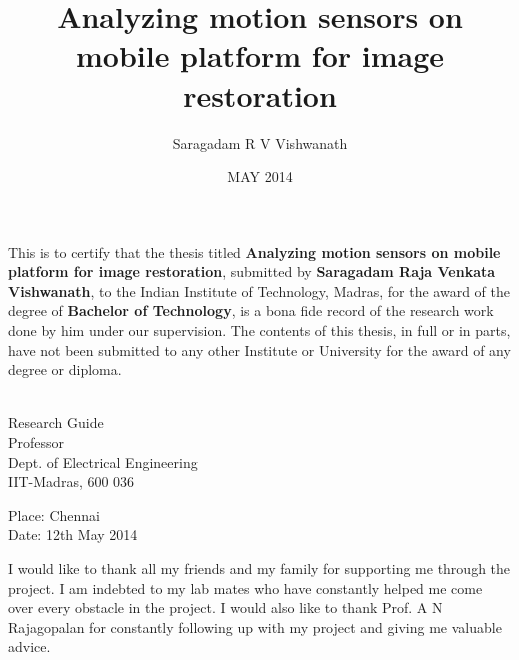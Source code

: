 \documentclass[BTech]{iitmdiss}
\begin{document}
\title{Analyzing motion sensors on mobile platform for image restoration}
\author{Saragadam R V Vishwanath}
\date{MAY 2014}
\maketitle
\pagebreak

\certificate

\vspace*{0.5in}

\noindent This is to certify that the thesis titled {\bf Analyzing
 motion sensors on mobile platform for image restoration}, submitted by
  {\bf Saragadam Raja Venkata Vishwanath}, 
  to the Indian Institute of Technology, Madras, for
the award of the degree of {\bf Bachelor of Technology}, is a bona fide
record of the research work done by him under our supervision.  The
contents of this thesis, in full or in parts, have not been submitted
to any other Institute or University for the award of any degree or
diploma.

\vspace*{1.5in}

\begin{singlespacing}
\hspace*{-0.25in}
\parbox{2.5in}{
 \\
\noindent Research Guide \\ 
\noindent Professor \\
\noindent Dept. of Electrical Engineering\\
\noindent IIT-Madras, 600 036 \\
} 
\hspace*{1.0in} 
\end{singlespacing}
\vspace*{0.25in}
\noindent Place: Chennai\\
Date: 12th May 2014

\pagebreak

\acknowledgements

I would like to thank all my friends and my family for supporting me 
through the project. I am indebted to my lab mates who have constantly 
helped me come over every obstacle in the project. I would also like to 
thank Prof. A N Rajagopalan for constantly following up with my project
and giving me valuable advice.
\end{document}

